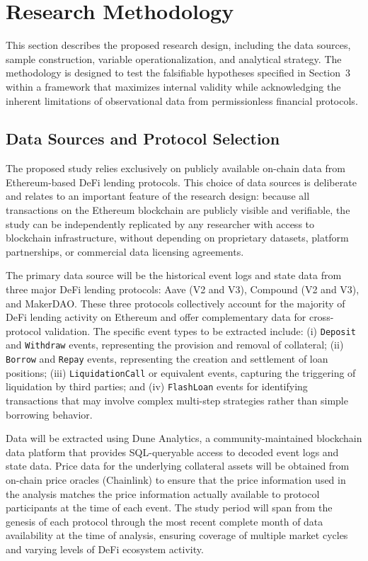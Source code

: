 \section{Research Methodology}

This section describes the proposed research design, including the data sources, sample construction, variable operationalization, and analytical strategy. The methodology is designed to test the falsifiable hypotheses specified in Section~3 within a framework that maximizes internal validity while acknowledging the inherent limitations of observational data from permissionless financial protocols.

\subsection{Data Sources and Protocol Selection}

The proposed study relies exclusively on publicly available on-chain data from Ethereum-based DeFi lending protocols. This choice of data sources is deliberate and relates to an important feature of the research design: because all transactions on the Ethereum blockchain are publicly visible and verifiable, the study can be independently replicated by any researcher with access to blockchain infrastructure, without depending on proprietary datasets, platform partnerships, or commercial data licensing agreements.

The primary data source will be the historical event logs and state data from three major DeFi lending protocols: Aave (V2 and V3), Compound (V2 and V3), and MakerDAO. These three protocols collectively account for the majority of DeFi lending activity on Ethereum and offer complementary data for cross-protocol validation. The specific event types to be extracted include: (i) \texttt{Deposit} and \texttt{Withdraw} events, representing the provision and removal of collateral; (ii) \texttt{Borrow} and \texttt{Repay} events, representing the creation and settlement of loan positions; (iii) \texttt{LiquidationCall} or equivalent events, capturing the triggering of liquidation by third parties; and (iv) \texttt{FlashLoan} events for identifying transactions that may involve complex multi-step strategies rather than simple borrowing behavior.

Data will be extracted using Dune Analytics, a community-maintained blockchain data platform that provides SQL-queryable access to decoded event logs and state data. Price data for the underlying collateral assets will be obtained from on-chain price oracles (Chainlink) to ensure that the price information used in the analysis matches the price information actually available to protocol participants at the time of each event. The study period will span from the genesis of each protocol through the most recent complete month of data availability at the time of analysis, ensuring coverage of multiple market cycles and varying levels of DeFi ecosystem activity.

